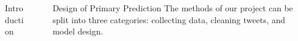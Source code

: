 \documentclass[final]{beamer}
\newlength{\sepwid}
\newlength{\onecolwid}
\newlength{\twocolwid}
\begin{document}
\begin{frame}[t]
\begin{columns}[t]
\begin{column}{\onecolwid}
\begin{block}{Introduction}
\end{block}

\end{column} %

\begin{column}{\sepwid}\end{column} %

\begin{column}{\twocolwid} %

\begin{columns}[t,totalwidth=\twocolwid] %

\begin{column}{\onecolwid} %


%
%
%
%
%



\begin{block}{Design of Primary Prediction}
The methods of our project can be split into three categories: collecting data, cleaning tweets, and model design.


\end{block}
\end{column}
\end{columns}
\end{column}
\end{columns}
\end{frame}
\end{document}
